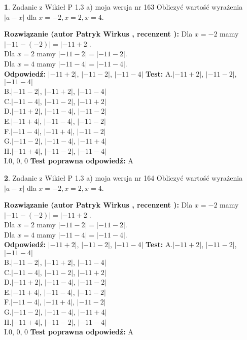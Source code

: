 \documentclass[12pt, a4paper]{article}
\theoremstyle{definition} %
\newtheorem{zad}{}
\newcommand{\zadStart}[1]{\begin{zad}#1\newline}
\newcommand{\zadStop}{\end{zad}}
\newcommand{\rozwStart}[2]{\noindent \textbf{Rozwiązanie (autor #1 , recenzent #2): }\newline}
\newcommand{\rozwStop}{\newline}
\newcommand{\odpStart}{\noindent \textbf{Odpowiedź:}\newline}
\newcommand{\odpStop}{\newline}
\newcommand{\testStart}{\noindent \textbf{Test:}\newline}
\newcommand{\testStop}{\newline}
\newcommand{\kluczStart}{\noindent \textbf{Test poprawna odpowiedź:}\newline}
\newcommand{\kluczStop}{\newline}
\begin{document}
\zadStart{Zadanie z Wikieł P 1.3 a) moja wersja nr 163}
Obliczyć wartość wyrażenia $|a - x|$ dla $x=-2,x=2,x=4$.
\zadStop
\rozwStart{Patryk Wirkus}{}
Dla $x = -2$ mamy $|-11 - (-2)| = |-11 + 2|$.\\
Dla $x = 2$ mamy $|-11 - 2| = |-11 - 2|$.\\
Dla $x = 4$ mamy $|-11 - 4| = |-11 - 4|$.\\
\rozwStop
\odpStart
$|-11 + 2|$, $|-11 - 2|$, $|-11 - 4|$
\odpStop
\testStart
A.$|-11 + 2|$, $|-11 - 2|$, $|-11 - 4|$\\
B.$|-11 - 2|$, $|-11 + 2|$, $|-11 - 4|$\\
C.$|-11 - 4|$, $|-11 - 2|$, $|-11 + 2|$\\
D.$|-11 + 2|$, $|-11 - 4|$, $|-11 - 2|$\\
E.$|-11 + 4|$, $|-11 - 4|$, $|-11 - 2|$\\
F.$|-11 - 4|$, $|-11 + 4|$, $|-11 - 2|$\\
G.$|-11 - 2|$, $|-11 - 4|$, $|-11 + 4|$\\
H.$|-11 + 4|$, $|-11 - 2|$, $|-11 - 4|$\\
I.$0$, $0$, $0$
\testStop
\kluczStart
A
\kluczStop



\zadStart{Zadanie z Wikieł P 1.3 a) moja wersja nr 164}
Obliczyć wartość wyrażenia $|a - x|$ dla $x=-2,x=2,x=4$.
\zadStop
\rozwStart{Patryk Wirkus}{}
Dla $x = -2$ mamy $|-11 - (-2)| = |-11 + 2|$.\\
Dla $x = 2$ mamy $|-11 - 2| = |-11 - 2|$.\\
Dla $x = 4$ mamy $|-11 - 4| = |-11 - 4|$.\\
\rozwStop
\odpStart
$|-11 + 2|$, $|-11 - 2|$, $|-11 - 4|$
\odpStop
\testStart
A.$|-11 + 2|$, $|-11 - 2|$, $|-11 - 4|$\\
B.$|-11 - 2|$, $|-11 + 2|$, $|-11 - 4|$\\
C.$|-11 - 4|$, $|-11 - 2|$, $|-11 + 2|$\\
D.$|-11 + 2|$, $|-11 - 4|$, $|-11 - 2|$\\
E.$|-11 + 4|$, $|-11 - 4|$, $|-11 - 2|$\\
F.$|-11 - 4|$, $|-11 + 4|$, $|-11 - 2|$\\
G.$|-11 - 2|$, $|-11 - 4|$, $|-11 + 4|$\\
H.$|-11 + 4|$, $|-11 - 2|$, $|-11 - 4|$\\
I.$0$, $0$, $0$
\testStop
\kluczStart
A
\kluczStop
\end{document}
